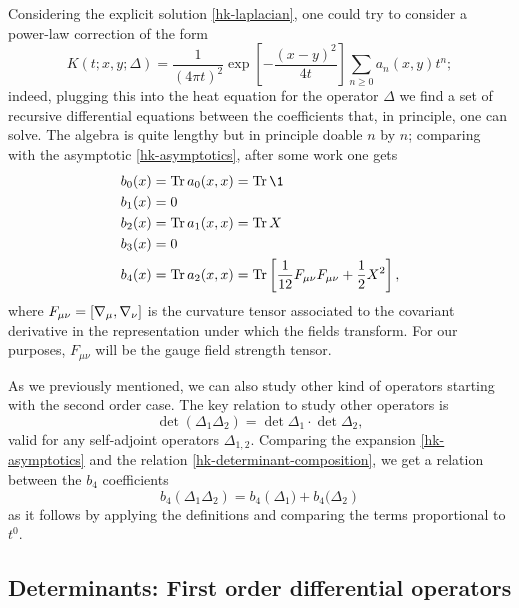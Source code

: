 Considering the explicit solution \eqref{hk-laplacian}, one could try to consider a power-law correction of the form
\begin{equation}\label{hk-delta2-full-solution}
K \left( t;x,y; \Delta \right)
	=
\frac{1}{(4 \pi t)^{2}} \exp\left[ - \frac{(x-y)^2}{4t} \right]
\sum_{n \geq 0}
	a_{n}(x,y) t^{n}
;
\end{equation} indeed, plugging this into the heat equation for the operator $\Delta$ we find a set of recursive differential equations between the coefficients that, in principle, one can solve. The algebra is quite lengthy but in principle doable $n$ by $n$;  comparing with the asymptotic \eqref{hk-asymptotics}, after some work one gets
\begin{align}
 b_0(x) &  = \Tr a_0(x,x) = \Tr \1
\\
 b_1(x) &  = 0 
\\
 b_2(x) &  = \Tr  a_1(x,x) = \Tr X
\\
 b_3(x) &  = 0 
\\ \label{b4-second-order}
 b_4(x) & = \Tr a_2(x,x) = \Tr \left[ \frac{1}{12} F_{\mu\nu} F_{\mu\nu}  + \frac{1}{2} X^2 \right], 
\end{align}
where \(F_{\mu\nu} = [ { \mathcal{\nabla} }_\mu , { \mathcal{\nabla} }_\nu ] \) is the curvature tensor associated to the covariant derivative in the representation under which the fields transform. For our purposes, $F_{\mu\nu}$ will be the gauge field strength tensor. 


As we previously mentioned, we can also study  other kind of operators starting with the second order case. The key relation to study other operators is
\begin{equation}\label{hk-determinant-composition}
\det \left( \Delta_1\Delta_2\right)
	=
\det \Delta_1 \cdot \det \Delta_2,
\end{equation}
valid for any self-adjoint operators $\Delta_{1,2}$. Comparing the expansion \eqref{hk-asymptotics} and the relation \eqref{hk-determinant-composition}, we get a relation between the $b_4$  coefficients
\begin{equation}\label{hk-a4-composition}
b_4 \left( \Delta_1 \Delta_2 \right)
	=
b_4 \left( \Delta_1 ) + b_4( \Delta_2 \right)
\end{equation}
as it follows by applying the definitions and comparing the terms proportional to $t^0$. %




\subsection{Determinants: First order differential operators}

